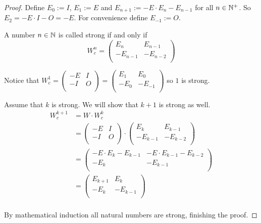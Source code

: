 \begin{proof}
  Define $E_{0} := I$, $E_{1} := E$ and
  $E_{n+1} := -E \cdot E_{n} - E_{n-1}$ for all $n\in\mathbb{N}^{+}$. So
  $E_{2} = -E \cdot I - O = -E$. For convenience define $E_{-1} := O$. 

  A number $n\in\mathbb{N}$ is called strong if and only if
  \[
  W_{c}^{n}
  =
  \left(
  \begin{array}{cc}
     E_{n} &  E_{n-1}  \\
    -E_{n-1} & -E_{n-2} \\
  \end{array}
  \right)
  \]

  Notice that
  $W_{c}^{1} = \left(\begin{smallmatrix} -E & I \\ -I & O \\\end{smallmatrix}\right) = \left(\begin{smallmatrix} E_{1} & E_{0} \\ -E_{0} & -E_{-1} \\\end{smallmatrix}\right)$
  so $1$ is strong.

  Assume that $k$ is strong. We will show that $k+1$ is strong as well.
  \[
  \begin{aligned}
  W_{c}^{k+1}
  & = W \cdot W_{c}^{k} \\
  & =
  \left(
  \begin{array}{cc}
    -E & I \\
    -I & O \\
  \end{array}
  \right)
  \cdot
  \left(
  \begin{array}{cc}
     E_{k} &  E_{k-1}  \\
    -E_{k-1} & -E_{k-2} \\
  \end{array}
  \right) \\
  & =
  \left(
  \begin{array}{cc}
    -E \cdot E_{k} - E_{k-1} & -E \cdot E_{k-1} - E_{k-2} \\
    -E_{k}                  & -E_{k-1}                  \\
  \end{array}
  \right) \\
  & =
  \left(
  \begin{array}{cc}
     E_{k+1} &  E_{k} \\
    -E_{k} & -E_{k-1} \\
  \end{array}
  \right) \\
  \end{aligned}
  \]

  By mathematical induction all natural
  numbers are strong, finishing the proof.
\end{proof}

